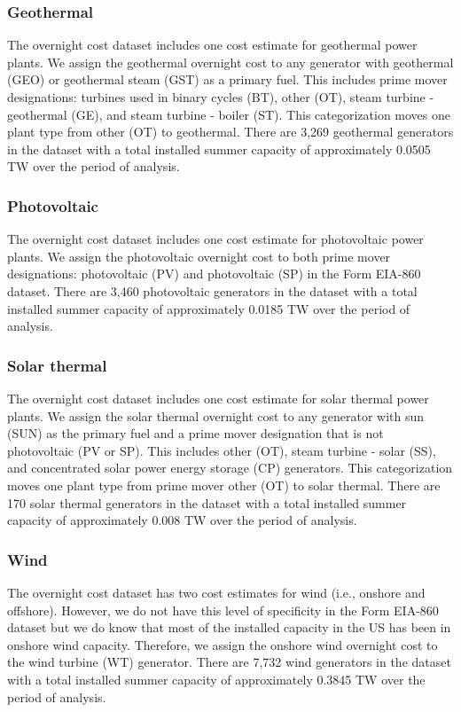\documentclass[10pt]{amsart}
\begin{document}
\subsubsection{Geothermal}
The overnight cost dataset includes one cost estimate for geothermal power plants. 
We assign the geothermal overnight cost to any generator with geothermal (GEO) or geothermal steam (GST) as a primary fuel. 
This includes prime mover designations: turbines used in binary cycles (BT), other (OT), steam turbine - geothermal (GE), and steam turbine - boiler (ST).  
This categorization moves one plant type from other (OT) to geothermal. 
There are 3,269 geothermal generators in the dataset with a total installed summer capacity of approximately 0.0505 TW over the period of analysis. 

\subsubsection{Photovoltaic}
The overnight cost dataset includes one cost estimate for photovoltaic power plants.
We assign the photovoltaic overnight cost to both prime mover designations: photovoltaic (PV) and photovoltaic (SP) in the Form EIA-860 dataset.
There are 3,460 photovoltaic generators in the dataset with a total installed summer capacity of approximately 0.0185 TW over the period of analysis. 

\subsubsection{Solar thermal}
The overnight cost dataset includes one cost estimate for solar thermal power plants. 
We assign the solar thermal overnight cost to any generator with sun (SUN) as the primary fuel and a prime mover designation that is not photovoltaic (PV or SP).
This includes other (OT), steam turbine - solar (SS), and concentrated solar power energy storage (CP) generators.
This categorization moves one plant type from prime mover other (OT) to solar thermal.   
There are 170 solar thermal generators in the dataset with a total installed summer capacity of approximately 0.008 TW over the period of analysis.

\subsubsection{Wind}
The overnight cost dataset has two cost estimates for wind (i.e., onshore and offshore).
However, we do not have this level of specificity in the Form EIA-860 dataset but we do know that most of the installed capacity in the US has been in onshore wind capacity. 
Therefore, we assign the onshore wind overnight cost to the wind turbine (WT) generator. 
There are 7,732 wind generators in the dataset with a total installed summer capacity of approximately 0.3845 TW over the period of analysis. 
\end{document}

